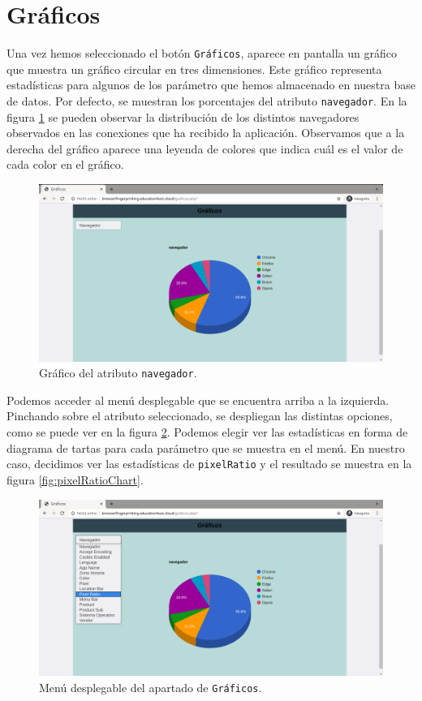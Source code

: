 \section{Gráficos}

Una vez hemos seleccionado el botón \texttt{Gráficos}, aparece en pantalla un gráfico que muestra un gráfico circular en tres dimensiones. 
Este gráfico representa estadísticas para algunos de los parámetro que hemos almacenado en nuestra base de datos. Por defecto, se muestran los porcentajes del atributo \texttt{navegador}. En la figura \ref{fig:navegadorChart} se pueden observar la distribución de los distintos navegadores observados en las conexiones que ha recibido la aplicación. Observamos que a la derecha del gráfico aparece una leyenda de colores que indica cuál es el valor de cada color en el gráfico. 

\begin{figure}[tbp]
	\centering
	\includegraphics[width=1\textwidth]{Images/navegadorChart.png}
	\caption{Gráfico del atributo \texttt{navegador}.}
	\label{fig:navegadorChart}
\end{figure}

Podemos acceder al menú desplegable que se encuentra arriba a la izquierda. Pinchando sobre el atributo seleccionado, se despliegan las distintas opciones, como se puede ver en la figura \ref{fig:menuChart}. Podemos elegir ver las estadísticas en forma de diagrama de tartas para cada parámetro que se muestra en el menú. En nuestro caso, decidimos ver las estadísticas de \texttt{pixelRatio} y el resultado se muestra en la figura \ref{fig:pixelRatioChart}.

\begin{figure}[tbp]
	\centering
	\includegraphics[width=1\textwidth]{Images/menuChart.png}
	\caption{Menú desplegable del apartado de \texttt{Gráficos}.}
	\label{fig:menuChart}
\end{figure}

